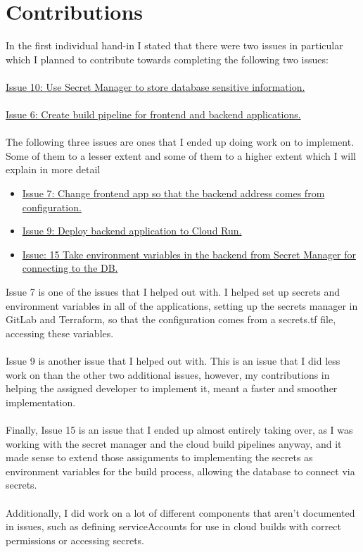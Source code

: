 \section{Contributions}
In the first individual hand-in I stated that there were two issues in particular which I planned to contribute towards completing the following two issues:\\\\
\href{https://gitlab.sdu.dk/jolee18/cloud-bite-terraform-g-10/-/issues/10}{Issue 10: Use Secret Manager to store database sensitive information.}\\\\
\href{https://gitlab.sdu.dk/jolee18/cloud-bite-terraform-g-10/-/issues/6}{Issue 6: Create build pipeline for frontend and backend applications.}\\\\
The following three issues are ones that I ended up doing work on to implement. Some of them to a lesser extent and some of them to a higher extent which I will explain in more detail

\begin{itemize}
    \item \href{https://gitlab.sdu.dk/jolee18/cloud-bite-terraform-g-10/-/issues/7}{Issue 7: Change frontend app so that the backend address comes from configuration.}
    \item
          \href{https://gitlab.sdu.dk/jolee18/cloud-bite-terraform-g-10/-/issues/9}{Issue 9: Deploy backend application to Cloud Run.}
    \item
          \href{https://gitlab.sdu.dk/jolee18/cloud-bite-terraform-g-10/-/issues/15}{Issue: 15 Take environment variables in the backend from Secret Manager for connecting to the DB.}
\end{itemize}
Issue 7 is one of the issues that I helped out with. I helped set up secrets and environment variables in all of the applications, setting up the secrets manager in GitLab and Terraform, so that the configuration comes from a secrets.tf file, accessing these variables.
\\\\
Issue 9 is another issue that I helped out with. This is an issue that I did less work on than the other two additional issues, however, my contributions in helping the assigned developer to implement it, meant a faster and smoother implementation.
\\\\
Finally, Issue 15 is an issue that I ended up almost entirely taking over, as I was working with the secret manager and the cloud build pipelines anyway, and it made sense to extend those assignments to implementing the secrets as environment variables for the build process, allowing the database to connect via secrets.
\\\\
Additionally, I did work on a lot of different components that aren't documented in issues, such as defining serviceAccounts for use in cloud builds with correct permissions or accessing secrets.